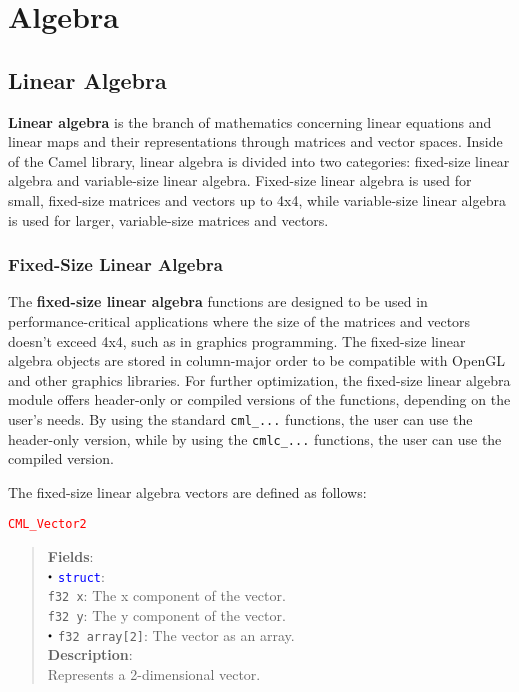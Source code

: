 \documentclass[a4paper,oneside,8pt]{extarticle}
\newcommand{\union}[1]{
  \noindent\textcolor{red}{\texttt{#1}}
  \vspace{-0.3em}
}
\renewcommand{\dot}{\raisebox{0.3ex}{\scalebox{0.6}{$\bullet$}}}
\theoremstyle{definition}
\begin{document}
\section{Algebra} \label{sec:algebra}

\subsection{Linear Algebra}

\textbf{Linear algebra} is the branch of mathematics concerning linear equations and linear maps and their representations through matrices and vector spaces. Inside of the Camel library, linear algebra is divided into two categories: fixed-size linear algebra and variable-size linear algebra. Fixed-size linear algebra is used for small, fixed-size matrices and vectors up to 4x4, while variable-size linear algebra is used for larger, variable-size matrices and vectors.

\subsubsection{Fixed-Size Linear Algebra}

The \textbf{fixed-size linear algebra} functions are designed to be used in performance-critical applications where the size of the matrices and vectors doesn't exceed 4x4, such as in graphics programming. The fixed-size linear algebra objects are stored in column-major order to be compatible with OpenGL and other graphics libraries. For further optimization, the fixed-size linear algebra module offers header-only or compiled versions of the functions, depending on the user's needs. By using the standard \texttt{cml\_...} functions, the user can use the header-only version, while by using the \texttt{cmlc\_...} functions, the user can use the compiled version.

The fixed-size linear algebra vectors are defined as follows: \newline

\union{CML\_Vector2}
\begin{quote}
  \textbf{Fields}: \\
  $\dot$ \textcolor{blue}{\texttt{struct}}: \\
  \indent\hspace{1em} \texttt{f32 x}: The x component of the vector. \\
  \indent\hspace{1em} \texttt{f32 y}: The y component of the vector. \\
  $\dot$ \texttt{f32 array[2]}: The vector as an array. \\

  \vspace{-0.75em}
  \textbf{Description}: \\
  Represents a 2-dimensional vector. \\
\end{quote}
\end{document}
